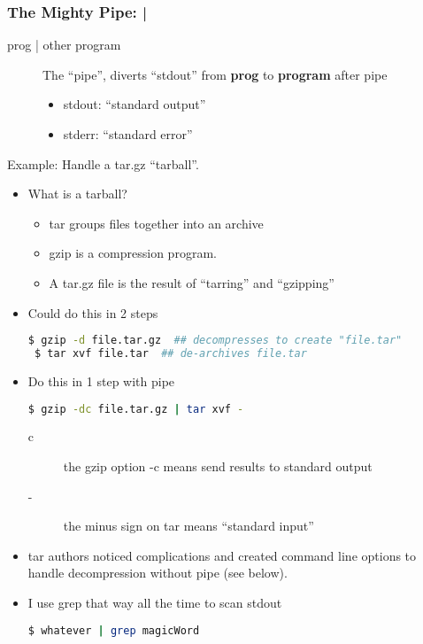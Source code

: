 \documentclass[English]{beamer}
\begin{document}
\begin{frame}
  \frametitle{ The Mighty Pipe: | }
  \begin{description}
  \item[prog | other program]  The ``pipe'', diverts
    ``stdout'' from \textbf{prog} to \textbf{program} after pipe
    \begin{itemize}
    \item stdout: ``standard output''
    \item stderr: ``standard error''
    \end{itemize}
  \end{description}

 Example: Handle a tar.gz ``tarball''.
  \begin{itemize}
   \item What is a tarball?
     \begin{itemize}
     \item tar groups files together into an archive
     \item gzip is a compression program.
     \item A tar.gz file is the result of ``tarring'' and ``gzipping''
     \end{itemize}

   \item Could do this in 2 steps
\begin{lstlisting}[breaklines=true,language=bash]
 $ gzip -d file.tar.gz  ## decompresses to create "file.tar"
 $ tar xvf file.tar  ## de-archives file.tar
\end{lstlisting}

\item Do this in 1 step with pipe
  \begin{lstlisting}[breaklines=true,language=bash] 
   $ gzip -dc file.tar.gz | tar xvf -
 \end{lstlisting}
 \begin{description}
\item[c] the gzip option -c means send results to standard output
 \item[-] the minus sign on tar means ``standard input''
 \end{description}

\item tar authors noticed complications and created command line
  options to handle decompression without pipe (see below).

  \item I use grep that way all the time to scan stdout 
     \begin{lstlisting}[breaklines=true,language=bash]
 $ whatever | grep magicWord 
     \end{lstlisting}
   \end{itemize}
 \end{frame}
\end{document}
